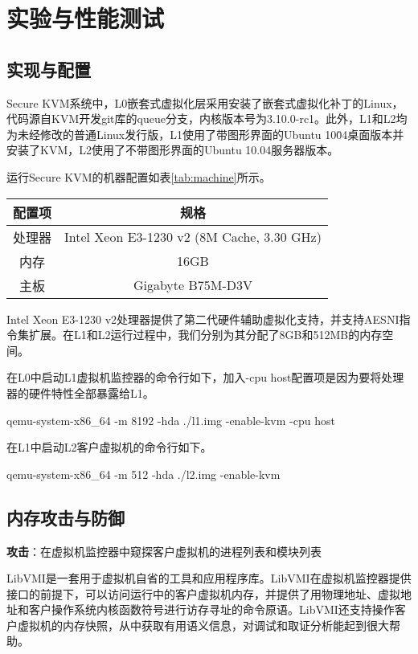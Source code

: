 \section{实验与性能测试}

\subsection{实现与配置}

Secure KVM系统中，L0嵌套式虚拟化层采用安装了嵌套式虚拟化补丁的Linux，代码源自KVM开发git库的queue分支，内核版本号为3.10.0-rc1。此外，L1和L2均为未经修改的普通Linux发行版，L1使用了带图形界面的Ubuntu 10\.04桌面版本并安装了KVM，L2使用了不带图形界面的Ubuntu 10.04服务器版本。

运行Secure KVM的机器配置如表\ref{tab:machine}所示。

\begin{table}[htpb]
\centering
\begin{tabular}{cc}
\toprule
配置项	& 规格\\
\midrule
处理器	& Intel Xeon E3-1230 v2 (8M Cache, 3.30 GHz)\\
内存	& 16GB\\
主板	& Gigabyte B75M-D3V\\
\bottomrule
\end{tabular}
\end{table}

Intel Xeon E3-1230 v2处理器提供了第二代硬件辅助虚拟化支持，并支持AESNI指令集扩展。在L1和L2运行过程中，我们分别为其分配了8GB和512MB的内存空间。

在L0中启动L1虚拟机监控器的命令行如下，加入-cpu host配置项是因为要将处理器的硬件特性全部暴露给L1。

qemu-system-x86\_64 -m 8192 -hda ./l1.img -enable-kvm -cpu host

在L1中启动L2客户虚拟机的命令行如下。

qemu-system-x86\_64 -m 512 -hda ./l2.img -enable-kvm

\subsection{内存攻击与防御}

\noindent
\textbf{攻击\uppercase\expandafter{}}：在虚拟机监控器中窥探客户虚拟机的进程列表和模块列表

LibVMI是一套用于虚拟机自省的工具和应用程序库。LibVMI在虚拟机监控器提供接口的前提下，可以访问运行中的客户虚拟机内存，并提供了用物理地址、虚拟地址和客户操作系统内核函数符号进行访存寻址的命令原语。LibVMI还支持操作客户虚拟机的内存快照，从中获取有用语义信息，对调试和取证分析能起到很大帮助。

